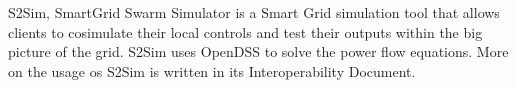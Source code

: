 S2\-Sim, Smart\-Grid Swarm Simulator is a Smart Grid simulation tool that allows clients to cosimulate their local controls and test their outputs within the big picture of the grid. S2\-Sim uses Open\-D\-S\-S to solve the power flow equations. More on the usage os S2\-Sim is written in its Interoperability Document. 